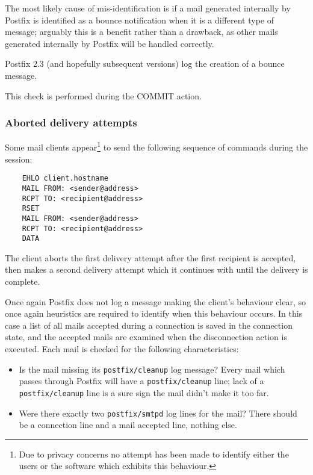 \documentclass[a4paper,12pt,draft]{article}
\newcommand{\daemon}[1]{%
    \texttt{postfix/#1}%
}
\begin{document}
The most likely cause of mis-identification is if a mail generated
internally by Postfix is identified as a bounce notification when it is a
different type of message; arguably this is a benefit rather than a
drawback, as other mails generated internally by Postfix will be handled
correctly.

Postfix 2.3 (and hopefully subsequent versions) log the creation of a
bounce message.

This check is performed during the COMMIT action.

\subsubsection{Aborted delivery attempts}

\label{aborted-delivery-attempts}

Some mail clients appear\footnote{Due to privacy concerns no attempt has
been made to identify either the users or the software which exhibits this
behaviour.} to send the following sequence of commands during
the \SMTP{} session:

\begin{verbatim}
    EHLO client.hostname
    MAIL FROM: <sender@address>
    RCPT TO: <recipient@address>
    RSET
    MAIL FROM: <sender@address>
    RCPT TO: <recipient@address>
    DATA
\end{verbatim}

The client aborts the first delivery attempt after the first recipient is
accepted, then makes a second delivery attempt which it continues with
until the delivery is complete.

Once again Postfix does not log a message making the client's behaviour
clear, so once again heuristics are required to identify when this
behaviour occurs.  In this case a list of all mails accepted during a
connection is saved in the connection state, and the accepted mails are
examined when the disconnection action is executed.  Each mail is checked
for the following characteristics:

\begin{itemize}

    \item Is the mail missing its \daemon{cleanup} log message?  Every mail
        which passes through Postfix will have a \daemon{cleanup} line;
        lack of a \daemon{cleanup} line is a sure sign the mail didn't make
        it too far.

    \item Were there exactly two \daemon{smtpd} log lines for the mail?
        There should be a connection line and a mail accepted line, nothing
        else.

\end{itemize}
\end{document}
